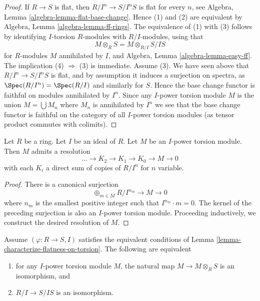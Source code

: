 \begin{proof}
If $R \to S$ is flat, then $R/I^n \to S/I^nS$ is flat for every $n$, see
Algebra, Lemma \ref{algebra-lemma-flat-base-change}.
Hence (1) and (2) are equivalent by
Algebra, Lemma \ref{algebra-lemma-ff-rings}.
The equivalence of (1) with (3) follows by identifying $I$-torsion
$R$-modules with $R/I$-modules, using that
$$
M \otimes_R S = M \otimes_{R/I} S/IS
$$
for $R$-modules $M$ annihilated by $I$, and
Algebra, Lemma \ref{algebra-lemma-easy-ff}.
The implication (4) $\Rightarrow$ (3) is immediate. Assume (3). We have
seen above that $R/I^n \to S/I^nS$ is flat, and by assumption it induces
a surjection on spectra, as $\Spec(R/I^n) = \Spec(R/I)$ and
similarly for $S$. Hence the base change functor is faithful on modules
annihilated by $I^n$. Since any $I$-power torsion module $M$ is the union
$M = \bigcup M_n$ where $M_n$ is annihilated by $I^n$ we see that the base
change functor is faithful on the category of all $I$-power torsion modules
(as tensor product commutes with colimits).
\end{proof}

\begin{lemma}
\label{lemma-I-power-torsion-presentation}
Let $R$ be a ring.
Let $I$ be an ideal of $R$.
Let $M$ be an $I$-power torsion module.
Then $M$ admits a resolution
$$
\ldots \to K_2 \to K_1 \to K_0 \to M \to 0
$$
with each $K_i$ a direct sum of copies of $R/I^n$ for $n$ variable.
\end{lemma}

\begin{proof}
There is a canonical surjection
$$
\oplus_{m \in M} R/I^{n_m} \to M \to 0
$$
where $n_m$ is the smallest positive integer such that $I^{n_m} \cdot m = 0$.
The kernel of the preceding surjection is also an $I$-power torsion module.
Proceeding inductively, we construct the desired resolution of $M$.
\end{proof}

\begin{lemma}
\label{lemma-neighbourhood-isomorphism}
Assume $(\varphi : R \to S, I)$ satisfies the equivalent conditions of
Lemma \ref{lemma-characterize-flatness-on-torsion}.
The following are equivalent
\begin{enumerate}
\item for any $I$-power torsion module $M$, the natural map
$M \to M \otimes_R S$ is an isomorphism, and
\item $R/I \to S/IS$ is an isomorphism.
\end{enumerate}
\end{lemma}

